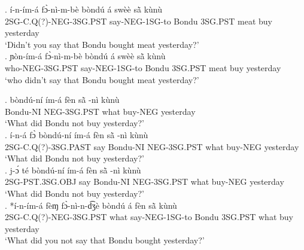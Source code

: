 \documentclass{assets/fieldnotes}
\begin{document}
\exg. í-n-ím-á fɔ̀-nì-m-bè bòndú á swèè sã̀  kùnù\\
2SG-C.Q(?)-NEG-3SG.PST say-NEG-1SG-to Bondu 3SG.PST meat buy yesterday\\
`Didn't you say that Bondu bought meat yesterday?' \\

\exg. ɲòn-ím-á fɔ̀-nì-m-bè bòndú á swèè sã̀  kùnù\\
who-NEG-3SG.PST say-NEG-1SG-to Bondu 3SG.PST meat buy yesterday\\
`who didn't say that Bondu bought meat yesterday?' \\



\exg. bòndú-ní ím-á fèn sã̀ -nì kùnù\\
Bondu-NI NEG-3SG.PST what buy-NEG yesterday\\
`What did Bondu not buy yesterday?' \\

\exg. í-n-á fɔ̀ bòndú-ní ím-á fèn sã̀ -nì kùnù\\
2SG-C.Q(?)-3SG.PAST say Bondu-NI NEG-3SG.PST what buy-NEG yesterday\\
`What did Bondu not buy yesterday?' \\

\exg. j-ɔ́ té bòndú-ní ím-á fèn sã̀ -nì kùnù\\
2SG-PST.3SG.OBJ say Bondu-NI NEG-3SG.PST what buy-NEG yesterday\\
`What did Bondu not buy yesterday?' \\

\exg. *í-n-ím-á fèɱ fɔ̀-nì-n-d͡ʒè bòndú á fèn sã̀  kùnù\\
2SG-C.Q(?)-NEG-3SG.PST what say-NEG-1SG-to Bondu 3SG.PST what buy yesterday\\
`What did you not say that Bondu bought yesterday?' \\
\end{document}
